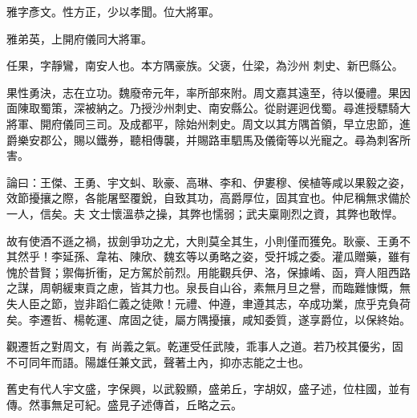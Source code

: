 \begin{pinyinscope}
 雅字彥文。性方正，少以孝聞。位大將軍。



 雅弟英，上開府儀同大將軍。



 任果，字靜鸞，南安人也。本方隅豪族。父褒，仕梁，為沙州
 刺史、新巴縣公。



 果性勇決，志在立功。魏廢帝元年，率所部來附。周文嘉其遠至，待以優禮。果因面陳取蜀策，深被納之。乃授沙州刺史、南安縣公。從尉遲迥伐蜀。尋進授驃騎大將軍、開府儀同三司。及成都平，除始州刺史。周文以其方隅首領，早立忠節，進爵樂安郡公，賜以鐵券，聽相傳襲，并賜路車駟馬及儀衛等以光寵之。尋為刺客所害。



 論曰：王傑、王勇、宇文虯、耿豪、高琳、李和、伊婁穆、侯植等咸以果毅之姿，效節擾攘之際，各能屠堅覆銳，自致其功，高爵厚位，固其宜也。仲尼稱無求備於一人，信矣。夫
 文士懷溫恭之操，其弊也懦弱；武夫稟剛烈之資，其弊也敢悍。



 故有使酒不遜之禍，拔劍爭功之尤，大則莫全其生，小則僅而獲免。耿豪、王勇不其然乎！李延孫、韋祐、陳欣、魏玄等以勇略之姿，受扞城之委。灌瓜贈藥，雖有愧於昔賢；禦侮折衝，足方駕於前烈。用能觀兵伊、洛，保據崤、函，齊人阻西路之謀，周朝緩東貢之慮，皆其力也。泉長自山谷，素無月旦之譽，而臨難慷慨，無失人臣之節，豈非蹈仁義之徒歟！元禮、仲遵，聿遵其志，卒成功業，庶乎克負荷矣。李遷哲、楊乾運、席固之徒，屬方隅擾攘，咸知委質，遂享爵位，以保終始。



 觀遷哲之對周文，有
 尚義之氣。乾運受任武陵，乖事人之道。若乃校其優劣，固不可同年而語。陽雄任兼文武，聲著土內，抑亦志能之士也。



 舊史有代人宇文盛，字保興，以武毅顯，盛弟丘，字胡奴，盛子述，位柱國，並有傳。然事無足可紀。盛見子述傳首，丘略之云。



\end{pinyinscope}